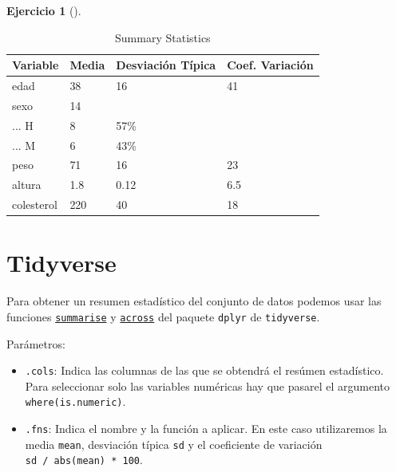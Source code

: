 \documentclass[
  a4paper,
]{scrreport}
\providecommand{\tightlist}{%
  \setlength{\itemsep}{0pt}\setlength{\parskip}{0pt}}\usepackage{longtable,booktabs,array}
\theoremstyle{definition}
\newtheorem{exercise}{Ejercicio}[chapter]
\theoremstyle{remark}
\begin{document}
\begin{exercise}[]
\begin{enumerate}
\begin{tcolorbox}
  \begin{table}

  \caption{Summary Statistics}
  \centering
  \begin{tabular}[t]{llll}
  \toprule
  Variable & Media & Desviación Típica & Coef. Variación\\
  \midrule
  edad & 38 & 16 & 41\\
  sexo & 14 &  & \\
  ... H & 8 & 57\% & \\
  ... M & 6 & 43\% & \\
  peso & 71 & 16 & 23\\
  \addlinespace
  altura & 1.8 & 0.12 & 6.5\\
  colesterol & 220 & 40 & 18\\
  \bottomrule
  \end{tabular}
  \end{table}

  \section{Tidyverse}

  Para obtener un resumen estadístico del conjunto de datos podemos usar
  las funciones
  \href{https://dplyr.tidyverse.org/reference/summarise.html}{\texttt{summarise}}
  y
  \href{https://dplyr.tidyverse.org/reference/across.html}{\texttt{across}}
  del paquete \texttt{dplyr} de \texttt{tidyverse}.

  Parámetros:

  \begin{itemize}
  \tightlist
  \item
    \texttt{.cols}: Indica las columnas de las que se obtendrá el
    resúmen estadístico. Para seleccionar solo las variables numéricas
    hay que pasarel el argumento \texttt{where(is.numeric)}.
  \item
    \texttt{.fns}: Indica el nombre y la función a aplicar. En este caso
    utilizaremos la media \texttt{mean}, desviación típica \texttt{sd} y
    el coeficiente de variación \texttt{sd\ /\ abs(mean)\ *\ 100}.
  \end{itemize}


\end{tcolorbox}
\end{enumerate}
\end{exercise}
\end{document}
